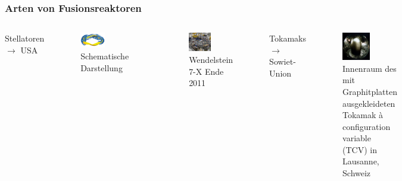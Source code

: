 \documentclass[aspectratio=169]{beamer}
\begin{document}
      \begin{frame}
        \frametitle{Arten von Fusionsreaktoren}
        \begin{columns}
          \center
          Stellatoren \( \rightarrow \) USA

          \begin{figure}
            \centering
            \includegraphics[width=0.5\textwidth]{figs/stellator}
            \caption{Schematische Darstellung}
            \label{figure:stellator}
          \end{figure}
          \begin{figure}
            \centering
            \includegraphics[width=0.5\textwidth]{figs/wendelstein}
            \caption{Wendelstein 7-X Ende 2011}
            \label{figure:stellator}
          \end{figure}

          \bigskip
          \center
          Tokamaks \( \rightarrow \) Sowiet-Union

          \begin{figure}
            \centering
            \includegraphics[width=0.5\textwidth]{figs/tokamak_innen}
            \caption{Innenraum des mit Graphitplatten ausgekleideten Tokamak à configuration variable (TCV) in Lausanne, Schweiz}
            \label{figure:tokamak_innen}
          \end{figure}

        \end{columns}
      \end{frame}
\end{document}
